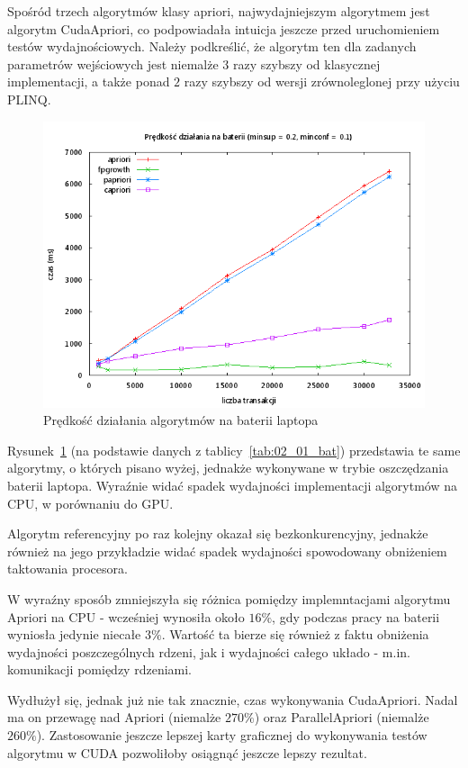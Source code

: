 Spośród trzech algorytmów klasy apriori, najwydajniejszym algorytmem jest algorytm CudaApriori, co podpowiadała intuicja jeszcze przed uruchomieniem testów wydajnościowych. Należy podkreślić, że algorytm ten dla zadanych parametrów wejściowych jest niemalże $3$ razy szybszy od klasycznej implementacji, a także ponad $2$ razy szybszy od wersji zrównoleglonej przy użyciu PLINQ.

\begin{figure}[H]
\centering
\includegraphics[width=1.1\textwidth]{figures/06/02_01_bat.png}
\caption{Prędkość działania algorytmów na baterii laptopa\label{rys:02_01_bat}}
\end{figure}

Rysunek~\ref{rys:02_01_bat} (na podstawie danych z tablicy~\ref{tab:02_01_bat}) przedstawia te same algorytmy, o których pisano wyżej, jednakże wykonywane w trybie oszczędzania baterii laptopa. Wyraźnie widać spadek wydajności implementacji algorytmów na CPU, w porównaniu do GPU.

Algorytm referencyjny po raz kolejny okazał się bezkonkurencyjny, jednakże również na jego przykładzie widać spadek wydajności spowodowany obniżeniem taktowania procesora.

W wyraźny sposób zmniejszyła się różnica pomiędzy implemntacjami algorytmu Apriori na CPU - wcześniej wynosiła około $16\%$, gdy podczas pracy na baterii wyniosła jedynie niecałe $3\%$. Wartość ta bierze się również z faktu obniżenia wydajności poszczególnych rdzeni, jak i wydajności całego układo - m.in. komunikacji pomiędzy rdzeniami.

Wydłużył się, jednak już nie tak znacznie, czas wykonywania CudaApriori. Nadal ma on przewagę nad Apriori (niemalże $270\%$) oraz ParallelApriori (niemalże $260\%$). Zastosowanie jeszcze lepszej karty graficznej do wykonywania testów algorytmu w CUDA pozwoliłoby osiągnąć jeszcze lepszy rezultat.

